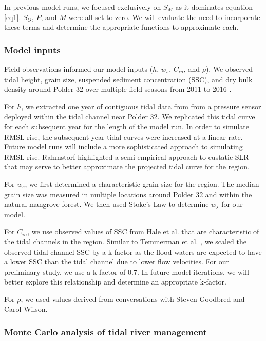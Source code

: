 \documentclass{wscpaperproc}
\theoremstyle{wsc}
\begin{document}
In previous model runs, we focused exclusively on $S_M$ as it dominates equation \ref{eq1}. $S_O$, $P$, and $M$ were all set to zero. We will evaluate the need to incorporate these terms and determine the appropriate functions to approximate each.

\subsubsection*{Model inputs}

Field observations informed our model inputs ($h$, $w_s$, $C_{in}$, and $\rho$). We observed tidal height, grain size, suspended sediment concentration (SSC), and dry bulk density around Polder 32 over multiple field seasons from 2011 to 2016 \cite{auerbachFloodRiskNatural2015,haleObservationsScalingTidal2019}.

For $h$, we extracted one year of contiguous tidal data from from a pressure sensor deployed within the tidal channel near Polder 32. We replicated this tidal curve for each subsequent year for the length of the model run. In order to simulate RMSL rise, the subsequent year tidal curves were increased at a linear rate. Future model runs will include a more sophisticated approach to simulating RMSL rise. Rahmstorf \cite{rahmstorfSemiEmpiricalApproachProjecting2007} highlighted a semi-empirical approach to eustatic SLR that may serve to better approximate the projected tidal curve for the region.

For $w_s$, we first determined a characteristic grain size for the region. The median grain size was measured in multiple locations around Polder 32 and within the natural mangrove forest. We then used Stoke's Law to determine $w_s$ for our model.

For $C_{in}$, we use observed values of SSC from Hale et al. \cite{haleObservationsScalingTidal2019} that are characteristic of the tidal channels in the region. Similar to Temmerman et al. \cite{temmermanModellingLongtermTidal2003,temmermanModellingEstuarineVariations2004}, we scaled the observed tidal channel SSC by a k-factor as the flood waters are expected to have a lower SSC than the tidal channel due to lower flow velocities. For our preliminary study, we use a k-factor of 0.7. In future model iterations, we will better explore this relationship and determine an appropriate k-factor.

For $\rho$, we used values derived from conversations with Steven Goodbred and Carol Wilson.

\subsubsection*{Monte Carlo analysis of tidal river management}
\end{document}

